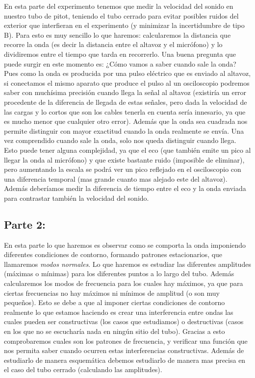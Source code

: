 \documentclass[12pt,a4paper]{article}
\begin{document}
En esta parte del experimento tenemos que medir la velocidad del sonido en nuestro tubo de pitot, teniendo el tubo cerrado para evitar posibles ruidos del exterior que interfieran en el experimento (y minimizar la incertidumbre de tipo B). Para esto es muy sencillo lo que haremos: calcularemos la distancia que recorre la onda (es decir la distancia entre el altavoz y el micrófono) y lo dividiremos entre el tiempo que tarda en recorrerlo. Una buena pregunta que puede surgir en este momento es: ¿Cómo vamos a saber cuando sale la onda? Pues como la onda es producida por una pulso eléctrico que es enviado al altavoz, si conectamos el mismo aparato que produce el pulso al un osciloscopio podremos saber con muchísima precisión cuando llega la señal al altavoz (existiría un error procedente de la diferencia de llegada de estas señales, pero dada la velocidad de las cargas y lo cortos que son los cables tenerla en cuenta sería innesario, ya que es mucho menor que cualquier otro error). Además que la onda sea cuadrada nos permite distinguir con mayor exactitud cuando la onda realmente se envía. Una vez comprendido cuando sale la onda, solo nos queda distinguir cuando llega. Esto puede tener alguna complejidad, ya que el eco (que también emite un pico al llegar la onda al micrófono) y que existe bastante ruido (imposible de eliminar), pero aumentando la escala se podrá ver un pico reflejado en el osciloscopio con una diferencia temporal (mas grande cuanto mas alejado este del altavoz). Además deberíamos medir la diferencia de tiempo entre el eco y la onda enviada para contrastar también la velocidad del sonido.  

\subsection{Parte 2:} 
 
En esta parte lo que haremos es observar como se comporta la onda imponiendo diferentes condiciones de contorno, formando patrones estacionarios, que llamaremos \textit{modos normales}. Lo que haremos es estudiar las diferentes amplitudes (máximas o mínimas) para los diferentes puntos a lo largo del tubo. Además calcularemos los modos de frecuencia para los cuales hay máximos, ya que para ciertas frecuencias no hay máximos ni mínimos de amplitud (o son muy pequeños). Esto se debe a que al imponer ciertas condiciones de contorno realmente lo que estamos haciendo es crear una interferencia entre ondas las cuales pueden ser constructivas (los casos que estudiamos) o destructivas (casos en los que no se escucharía nada en ningún sitio del tubo). Gracias a esto comprobaremos cuales son los patrones de frecuencia, y verificar una función que nos permita saber cuando ocurren estas interferencias constructivas. Además de estudiarlo de manera esquemática debemos estudiarlo de manera mas precisa en el caso del tubo cerrado (calculando las amplitudes). 
 
\end{document}
